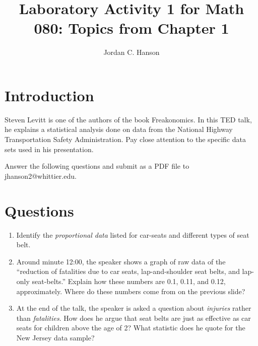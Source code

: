\documentclass{article}
\begin{document}
\title{Laboratory Activity 1 for Math 080: Topics from Chapter 1}
\author{Jordan C. Hanson}
\maketitle

\section{Introduction}

Steven Levitt is one of the authors of the book Freakonomics.  In this TED talk, he explains a statistical analysis done on data from the National Highway Transportation Safety Administration.  Pay close attention to the specific data sets used in his presentation.

Answer the following questions and submit as a PDF file to jhanson2@whittier.edu.

\section{Questions}

\begin{enumerate}
\item Identify the \textit{proportional data} listed for car-seats and different types of seat belt. \\ \vspace{1cm}
\item Around minute 12:00, the speaker shows a graph of raw data of the ``reduction of fatalities due to car seats, lap-and-shoulder seat belts, and lap-only seat-belts.''  Explain how these numbers are 0.1, 0.11, and 0.12, approximately.  Where do these numbers come from on the previous slide? \\ \vspace{2 cm}
\item At the end of the talk, the speaker is asked a question about \textit{injuries} rather than \textit{fatalities}.  How does he argue that seat belts are just as effective as car seats for children above the age of 2?  What statistic does he quote for the New Jersey data sample?
\end{enumerate}
\end{document}
